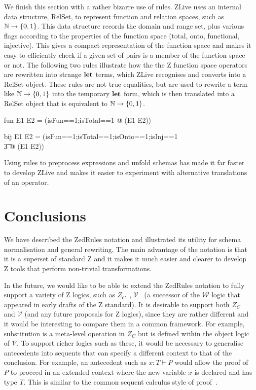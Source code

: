 \documentclass{entcs}
\newcommand{\V}{\mathcal{V}}
\newcommand{\Zc}{Z_C}
\begin{document}
We finish this section with a rather bizarre use of rules.  ZLive uses
an internal data structure, RelSet, to represent function and relation
spaces, such as $\nat \fun \{0,1\}$.  This data structure records the
domain and range set, plus various flags according to the properties
of the function space (total, onto, functional, injective).  This
gives a compact representation of the function space and makes it easy
to efficiently check if a given set of pairs is a member of the
function space or not.  The following two rules illustrate how the the
Z function space operators are rewritten into strange $\mathop{\mathstrut{\mbox{\textbf{let}}}}\nolimits$ terms,
which ZLive recognises and converts into a RelSet object.  These rules
are not true equalities, but are used to rewrite a term like $\nat
\fun \{0,1\}$ into the temporary $\mathop{\mathstrut{\mbox{\textbf{let}}}}\nolimits$ form, which is then translated
into a RelSet object that is equivalent to $\nat \fun \{0,1\}$.

\begin{zedrule}{fun}
   E1 \fun E2 = (\LET isFun==1;isTotal==1 @ \power (E1 \cross E2))
\end{zedrule}
\begin{zedrule}{bij}
   E1 \bij E2 = (\LET isFun==1;isTotal==1;isOnto==1;isInj==1 \\
   \t3               @ \power (E1 \cross E2))
\end{zedrule}

Using rules to preprocess expressions and unfold schemas has made it
far faster to develop ZLive and makes it easier to experiment with
alternative translations of an operator.


\section{Conclusions} \label{sec:concl}

We have described the ZedRules notation and illustrated its utility
for schema normalisation and general rewriting.  The main advantage
of the notation is that it is a superset of standard Z and it makes it
much easier and clearer to develop Z tools that perform non-trivial
transformations.


In the future, we would like to be able to extend the ZedRules
notation to fully support a variety of Z logics, such as
$\Zc$~\cite{henson:revising-z-1-99,henson:revising-z-2-99},
$\V$~\cite{brien:calculus-schemas-z00} (a successor of the
$\mathcal{W}$ logic that appeared in early drafts of the Z standard).
It is desirable to support both $\Zc$ and $\V$ (and any future
proposals for Z logics), since they are rather different and it would
be interesting to compare them in a common framework.  For example,
substitution is a meta-level operation in $\Zc$ but is defined within
the object logic of $\V$.  To support richer logics such as these, it
would be necessary to generalise antecedents into sequents that can
specify a different context to that of the conclusion.  For example,
an antecedent such as $x:T \vdash P$ would allow the proof of $P$ to
proceed in an extended context where the new variable $x$ is declared
and has type $T$.  This is similar to the common sequent calculus
style of proof~\cite{girard:proofs-types90}.
\end{document}
